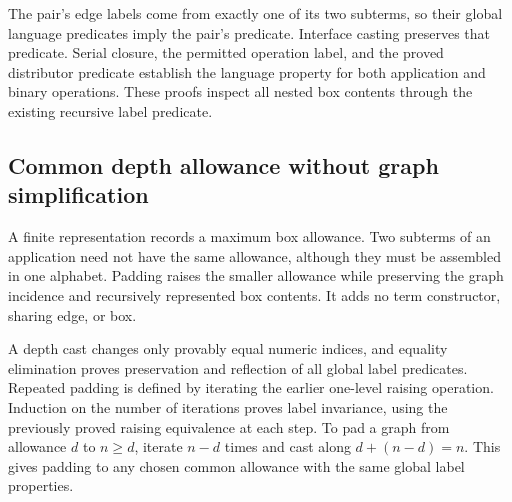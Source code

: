 

The pair's edge labels come from exactly one of its two subterms, so their
global language predicates imply the pair's predicate. Interface casting
preserves that predicate. Serial closure, the permitted operation label,
and the proved distributor predicate establish the language property for
both application and binary operations. These proofs inspect all nested
box contents through the existing recursive label predicate.




\subsection{Common depth allowance without graph simplification}
A finite representation records a maximum box allowance. Two subterms of
an application need not have the same allowance, although they must be
assembled in one alphabet. Padding raises the smaller allowance while
preserving the graph incidence and recursively represented box contents.
It adds no term constructor, sharing edge, or box.

A depth cast changes only provably equal numeric indices, and equality
elimination proves preservation and reflection of all global label
predicates. Repeated padding is defined by iterating the earlier one-level
raising operation. Induction on the number of iterations proves label
invariance, using the previously proved raising equivalence at each step.
To pad a graph from allowance $d$ to $n\ge d$, iterate $n-d$ times and
cast along $d+(n-d)=n$. This gives padding to any chosen common allowance
with the same global label properties.






